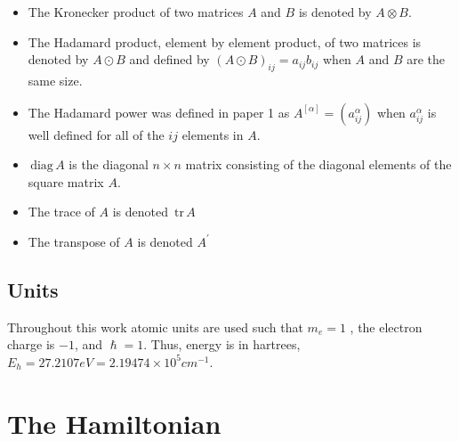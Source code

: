 \documentclass[12pt,thmsa]{article}
\begin{document}
\begin{itemize}
\item  The Kronecker product of two matrices $A$ and $B$ is denoted by $%
A\otimes B.$

\item  The Hadamard product, element by element product, of two matrices is
denoted by $A\odot B$ and defined by $\left( A\odot B\right)
_{ij}=a_{ij}b_{ij}$ when $A$ and $B$ are the same size.

\item  The Hadamard power was defined in paper 1 as $A^{\left[ \alpha
\right] }=\left( a_{ij}^\alpha \right) $ when $a_{ij}^\alpha $ is well
defined for all of the $ij$ elements in $A.$

\item  $\,\mathrm{diag}\,A$ is the diagonal $n\times n$ matrix consisting of
the diagonal elements of the square matrix $A.$

\item  The trace of $A$ is denoted $\,\mathrm{tr}\,A$

\item  The transpose of $A$ is denoted $A^{\prime }$
\end{itemize}

\subsection{Units}

Throughout this work atomic units are used such that $m_e=1$ , the electron
charge is $-1$, and $\hslash =1$. Thus, energy is in hartrees, $%
E_h=27.2107eV=2.19474\times 10^5cm^{-1}$.

\section{The Hamiltonian}
\end{document}
